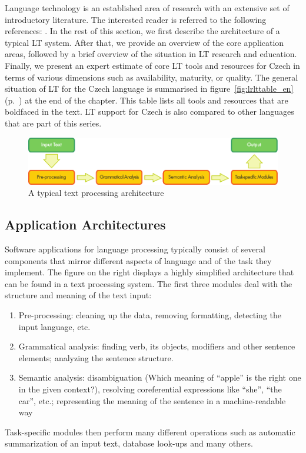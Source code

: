 \begin{multicols}{2}
 Language technology is an established area of research with an extensive set of introductory literature. The interested reader is referred to the following references: \cite{carstensen-etal1, jurafsky-martin01, manning-schuetze1, lt-world1, lt-survey1}.
In the rest of this section, we first describe the architecture of a typical LT system. After that, we provide an overview of the core application areas, followed by a brief overview of the situation in LT research and education. Finally, we present an expert estimate of core LT tools and resources for Czech in terms of various dimensions such as availability, maturity, or quality. The general situation of LT for the Czech language is summarised in figure~\ref{fig:lrlttable_en} (p.~\pageref{fig:lrlttable_en}) at the end of the chapter. This table lists all tools and resources that are boldfaced in the text. LT support for Czech is also compared to other languages that are part of this series.
\begin{figure}[b]
  \center
  \includegraphics[width=\textwidth]{../_media/english/text_processing_app_architecture}
  \caption{A typical text processing architecture}
  \label{fig:textprocessingarch_en}
\end{figure}


\subsection{Application Architectures}
Software applications for language processing typically consist of several components that mirror different aspects of language and of the task they implement. The figure on the right displays a highly simplified architecture that can be found in a text processing system. The first three modules deal with the structure and meaning of the text input:
\begin{enumerate}
  \item Pre-processing: cleaning up the data, removing formatting, detecting the input language, etc.
  \item Grammatical analysis: finding verb, its objects, modifiers and other sentence elements; analyzing the sentence structure.
  \item Semantic analysis: disambiguation (Which meaning of “apple” is the right one in the given context?), resolving coreferential expressions like “she”, “the car”, etc.; representing the meaning of the sentence in a machine-readable way
\end{enumerate}
Task-specific modules then perform many different operations such as automatic summarization of an input text, database look-ups and many others.
  

\end{multicols}
